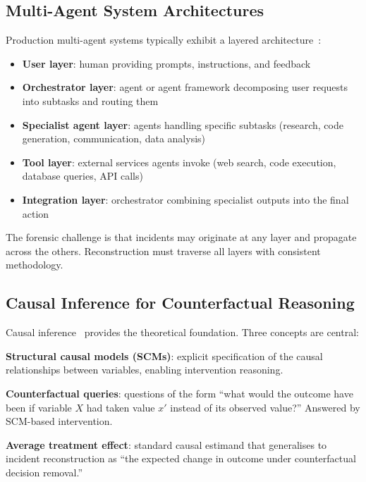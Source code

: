 \documentclass[sigconf,nonacm]{acmart}
\begin{document}
\subsection{Multi-Agent System Architectures}

Production multi-agent systems typically exhibit a layered
architecture~\cite{xi2024agentsurvey,wu2024multiagentsurv}:

\begin{itemize}
  \item \textbf{User layer}: human providing prompts, instructions,
        and feedback
  \item \textbf{Orchestrator layer}: agent or agent framework
        decomposing user requests into subtasks and routing them
  \item \textbf{Specialist agent layer}: agents handling
        specific subtasks (research, code generation, communication,
        data analysis)
  \item \textbf{Tool layer}: external services agents invoke (web
        search, code execution, database queries, API calls)
  \item \textbf{Integration layer}: orchestrator combining
        specialist outputs into the final action
\end{itemize}

The forensic challenge is that incidents may originate at any
layer and propagate across the others. Reconstruction must traverse
all layers with consistent methodology.

\subsection{Causal Inference for Counterfactual Reasoning}

Causal inference~\cite{pearl2009causality,peters2017elements}
provides the theoretical foundation. Three concepts are central:

\textbf{Structural causal models (SCMs)}: explicit specification
of the causal relationships between variables, enabling intervention
reasoning.

\textbf{Counterfactual queries}: questions of the form ``what
would the outcome have been if variable $X$ had taken value $x'$
instead of its observed value?'' Answered by SCM-based
intervention.

\textbf{Average treatment effect}: standard causal estimand that
generalises to incident reconstruction as ``the expected change in
outcome under counterfactual decision removal.''
\end{document}

